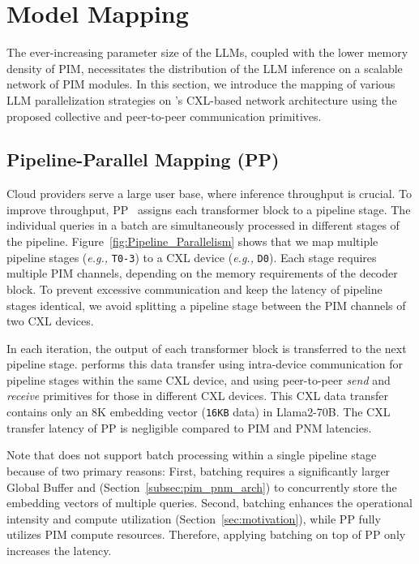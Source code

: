 \section{Model Mapping} \label{model mapping}

The ever-increasing parameter size of the LLMs, coupled with the lower memory density of PIM, necessitates the distribution of the LLM inference on a scalable network of PIM modules.
In this section, we introduce the mapping of various LLM parallelization strategies on \att{}'s CXL-based network architecture using the proposed collective and peer-to-peer communication primitives.

\subsection{Pipeline-Parallel Mapping (PP)}

Cloud providers serve a large user base, where inference throughput is crucial.
To improve throughput, PP~\cite{gpipe} assigns each transformer block to a pipeline stage.
The individual queries in a batch are simultaneously processed in different stages of the pipeline.
Figure~\ref{fig:Pipeline_Parallelism} shows that we map multiple pipeline stages (\textit{e.g.,} \texttt{T0-3}) to a CXL device (\textit{e.g.,} \texttt{D0}).
Each stage requires multiple PIM channels, depending on the memory requirements of the decoder block.
To prevent excessive communication and keep the latency of pipeline stages identical, we avoid splitting a pipeline stage between the PIM channels of two CXL devices.

In each iteration, the output of each transformer block is transferred to the next pipeline stage.
\att{} performs this data transfer using intra-device communication for pipeline stages within the same CXL device, and using peer-to-peer \textit{send} and \textit{receive} primitives for those in different CXL devices.
This CXL data transfer contains only an 8K embedding vector (\texttt{16KB} data) in Llama2-70B.
The CXL transfer latency of PP is negligible compared to PIM and PNM latencies.

Note that \att{} does not support batch processing within a single pipeline stage because of two primary reasons:
First, batching requires a significantly larger Global Buffer and \rf{} (Section~\ref{subsec:pim_pnm_arch}) to concurrently store the embedding vectors of multiple queries.
Second, batching enhances the operational intensity and compute utilization (Section~\ref{sec:motivation}), while PP fully utilizes PIM compute resources.
Therefore, applying batching on top of PP only increases the latency.

